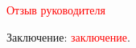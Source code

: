 \documentclass[master, fontsize=12pt]{diploma}
\begin{document}
\fillReviewHeader

\textcolor{red}{Отзыв руководителя}

\makeSimilarityLine

Заключение: \textcolor{red}{заключение}.

\makeReviewSignature
\end{document}
